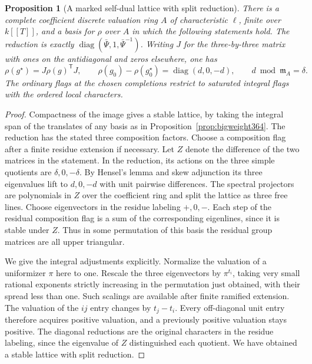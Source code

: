 \documentclass[a4paper,11pt]{article}
\newtheorem{proposition}{Proposition}[section]
\theoremstyle{definition}
\theoremstyle{remark}
\numberwithin{equation}{section}
\begin{document}
\begin{proposition}[A marked self-dual lattice with split reduction]
\label{prop:curvelattice366}
There is a complete coefficient discrete valuation ring \(A\)
of characteristic \(\ell\), finite over \(k[[T]]\), and a
basis for \(\rho\) over \(A\) in which the following
statements hold. The reduction is exactly
\(\operatorname{diag}(\bar\Psi,1,\bar\Psi^{-1})\).
Writing \(J\) for the three-by-three matrix with ones on the
antidiagonal and zeros elsewhere, one has
\[
       \rho(g^\star)=J\rho(g)^{\mathsf T}J,\qquad
       \rho(g_0)-\rho(g_0^\star)=\operatorname{diag}(d,0,-d),
                 \qquad d\bmod\mathfrak m_A=\delta .
\]
The ordinary flags at the chosen completions restrict to
saturated integral flags with the ordered local characters.
\end{proposition}
\begin{proof}
Compactness of the image gives a stable lattice, by taking
the integral span of the translates of any basis as in
Proposition~\ref{prop:bigweight364}. The reduction has the
stated three composition factors. Choose a composition flag
after a finite residue extension if necessary. Let \(Z\)
denote the difference of the two matrices in the statement.
In the reduction, its actions on the three simple quotients
are \(\delta,0,-\delta\). By Hensel's lemma and skew adjunction
its three eigenvalues lift to \(d,0,-d\) with unit pairwise
differences. The spectral projectors are polynomials in \(Z\)
over the coefficient ring and split the lattice as three
free lines. Choose eigenvectors in the residue labeling
\(+,0,-\). Each step of the residual composition flag is
a sum of the corresponding eigenlines, since it is stable
under \(Z\). Thus in some permutation of this basis the
residual group matrices are all upper triangular.

We give the integral adjustments explicitly. Normalize the
valuation of a uniformizer \(\pi\) here to one. Rescale the
three eigenvectors by \(\pi^{t_i}\), taking very small rational
exponents strictly increasing in the permutation just obtained,
with their spread less than one. Such scalings are available
after finite ramified extension. The valuation of the \(ij\)
entry changes by \(t_j-t_i\). Every off-diagonal unit entry
therefore acquires positive valuation, and a previously
positive valuation stays positive. The diagonal reductions
are the original characters in the residue labeling, since
the eigenvalue of \(Z\) distinguished each quotient.
We have obtained a stable lattice with split reduction.


\end{proof}
\end{document}
